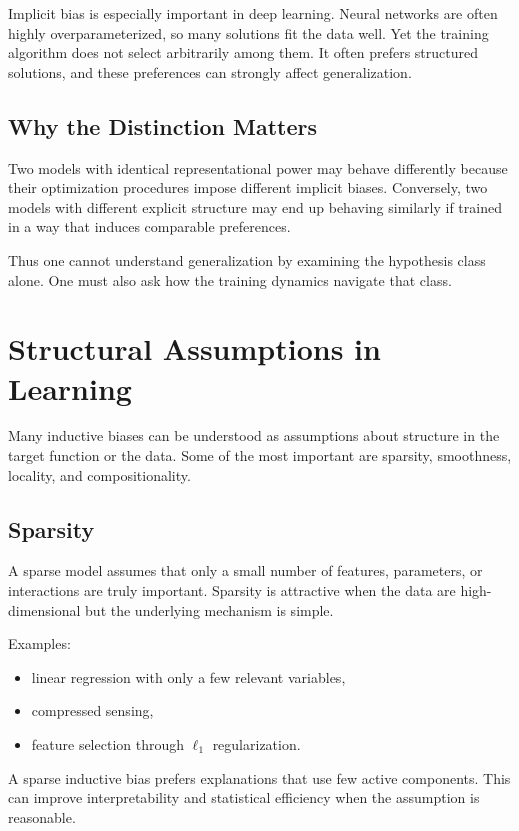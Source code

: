 Implicit bias is especially important in deep learning. Neural networks are often highly overparameterized, so many solutions fit the data well. Yet the training algorithm does not select arbitrarily among them. It often prefers structured solutions, and these preferences can strongly affect generalization.

\subsection{Why the Distinction Matters}

Two models with identical representational power may behave differently because their optimization procedures impose different implicit biases. Conversely, two models with different explicit structure may end up behaving similarly if trained in a way that induces comparable preferences.

Thus one cannot understand generalization by examining the hypothesis class alone. One must also ask how the training dynamics navigate that class.

\section{Structural Assumptions in Learning}

Many inductive biases can be understood as assumptions about structure in the target function or the data. Some of the most important are sparsity, smoothness, locality, and compositionality.

\subsection{Sparsity}

A sparse model assumes that only a small number of features, parameters, or interactions are truly important. Sparsity is attractive when the data are high-dimensional but the underlying mechanism is simple.

Examples:
\begin{itemize}
    \item linear regression with only a few relevant variables,
    \item compressed sensing,
    \item feature selection through $\ell_1$ regularization.
\end{itemize}

A sparse inductive bias prefers explanations that use few active components. This can improve interpretability and statistical efficiency when the assumption is reasonable.

